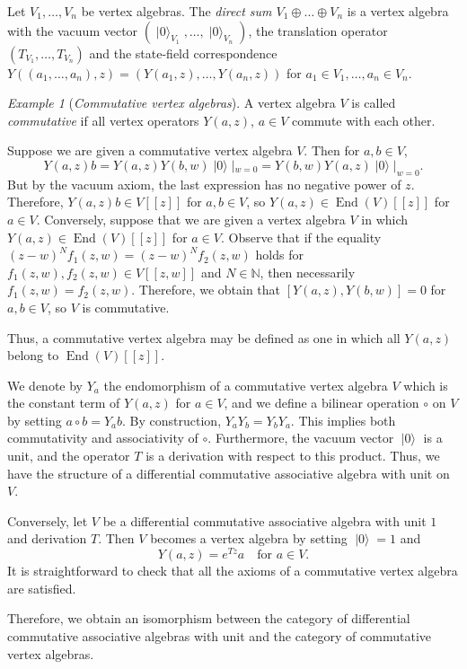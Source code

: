 \documentclass[a4paper, 12pt, reqno]{amsart}
\theoremstyle{remark}
\newtheorem{example}[theorem]{Example}
\DeclareMathOperator{\End}{End}
\DeclareMathOperator{\vac}{|0\rangle}
\begin{document}
Let $V_1, \dots, V_n$ be vertex algebras.
The \emph{direct sum $V_1 \oplus \dots \oplus V_n$} is a vertex algebra with the vacuum vector $(\vac_{V_1}, \dots, \vac_{V_n})$, the translation operator $(T_{V_1}, \dots, T_{V_n})$ and the state-field correspondence $Y((a_1, \dots, a_n), z) = (Y(a_1, z), \dots, Y(a_n, z))$ for $a_1 \in V_1, \dots, a_n \in V_n$.

\begin{example}[\emph{Commutative vertex algebras}]
  \label{exa:4}
  A vertex algebra $V$ is called \emph{commutative} if all vertex operators $Y(a, z)$, $a \in V$ commute with each other.

  Suppose we are given a commutative vertex algebra $V$.
  Then for $a, b \in V$,
  \begin{equation*}
    Y(a, z)b = Y(a, z)Y(b, w)\vac|_{w = 0} = Y(b, w)Y(a, z)\vac|_{w = 0}.
  \end{equation*}
  But by the vacuum axiom, the last expression has no negative power of $z$.
  Therefore, $Y(a, z)b \in V[[z]]$ for $a, b \in V$, so $Y(a, z) \in \End(V)[[z]]$ for $a \in V$.
  Conversely, suppose that we are given a vertex algebra $V$ in which $Y(a, z) \in \End(V)[[z]]$ for $a \in V$.
  Observe that if the equality $(z - w)^Nf_1(z, w) = (z - w)^Nf_2(z, w)$ holds for $f_1(z, w), f_2(z, w) \in V[[z, w]]$ and $N \in \mathbb{N}$, then necessarily $f_1(z, w) = f_2(z, w)$.
  Therefore, we obtain that $[Y(a, z), Y(b, w)] = 0$ for $a, b \in V$, so $V$ is commutative.

  Thus, a commutative vertex algebra may be defined as one in which all $Y(a, z)$ belong to $\End(V)[[z]]$.

  We denote by $Y_a$ the endomorphism of a commutative vertex algebra $V$ which is the constant term of $Y(a, z)$ for $a \in V$, and we define a bilinear operation $\circ$ on $V$ by setting $a\circ b = Y_ab$.
  By construction, $Y_aY_b = Y_bY_a$.
  This implies both commutativity and associativity of $\circ$.
  Furthermore, the vacuum vector $\vac$ is a unit, and the operator $T$ is a derivation with respect to this product.
  Thus, we have the structure of a differential commutative associative algebra with unit on $V$.

  Conversely, let $V$ be a differential commutative associative algebra with unit $1$ and derivation $T$.
  Then $V$ becomes a vertex algebra by setting $\vac = 1$ and
  \begin{equation*}
    Y(a, z) = e^{Tz}a \quad \text{for $a \in V$}.
  \end{equation*}
  It is straightforward to check that all the axioms of a commutative vertex algebra are satisfied.

  Therefore, we obtain an isomorphism between the category of differential commutative associative algebras with unit and the category of commutative vertex algebras.
\end{example}
\end{document}

